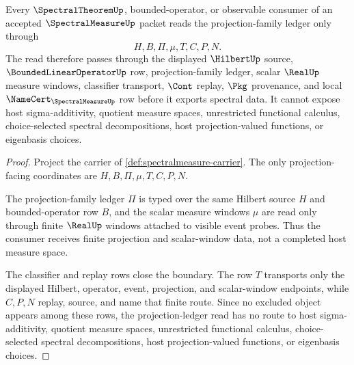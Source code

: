 \begin{theorem}
\label{thm:spectral-measure-projection-ledger-nonescape}
Every $\SpectralTheoremUp$, bounded-operator, or observable consumer of an accepted $\SpectralMeasureUp$ packet reads the projection-family ledger only through
$$
H,B,\Pi,\mu,T,C,P,N .
$$
The read therefore passes through the displayed $\HilbertUp$ source, $\BoundedLinearOperatorUp$ row, projection-family ledger, scalar $\RealUp$ measure windows, classifier transport, $\Cont$ replay, $\Pkg$ provenance, and local $\NameCert_{\SpectralMeasureUp}$ row before it exports spectral data. It cannot expose host sigma-additivity, quotient measure spaces, unrestricted functional calculus, choice-selected spectral decompositions, host projection-valued functions, or eigenbasis choices.
\end{theorem}
\begin{proof}
Project the carrier of \autoref{def:spectralmeasure-carrier}. The only projection-facing coordinates are $H,B,\Pi,\mu,T,C,P,N$.

The projection-family ledger $\Pi$ is typed over the same Hilbert source $H$ and bounded-operator row $B$, and the scalar measure windows $\mu$ are read only through finite $\RealUp$ windows attached to visible event probes. Thus the consumer receives finite projection and scalar-window data, not a completed host measure space.

The classifier and replay rows close the boundary. The row $T$ transports only the displayed Hilbert, operator, event, projection, and scalar-window endpoints, while $C,P,N$ replay, source, and name that finite route. Since no excluded object appears among these rows, the projection-ledger read has no route to host sigma-additivity, quotient measure spaces, unrestricted functional calculus, choice-selected spectral decompositions, host projection-valued functions, or eigenbasis choices.
\end{proof}

